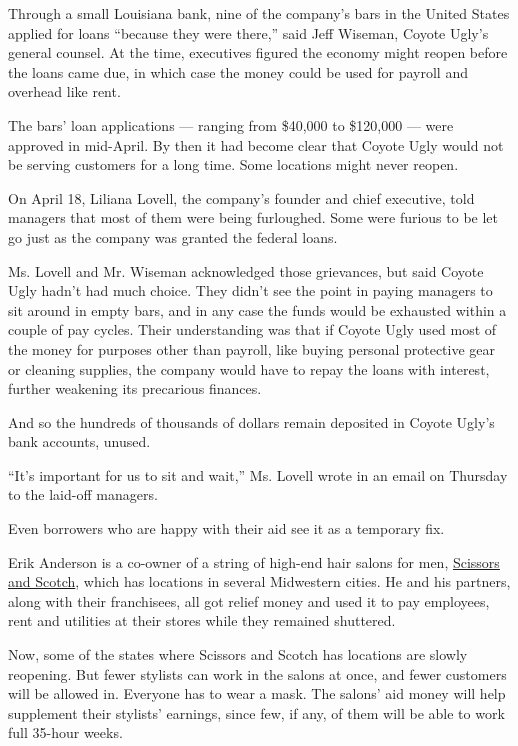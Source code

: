 Through a small Louisiana bank, nine of the company's bars in the United
States applied for loans ``because they were there,'' said Jeff Wiseman,
Coyote Ugly's general counsel. At the time, executives figured the
economy might reopen before the loans came due, in which case the money
could be used for payroll and overhead like rent.

The bars' loan applications --- ranging from \$40,000 to \$120,000 ---
were approved in mid-April. By then it had become clear that Coyote Ugly
would not be serving customers for a long time. Some locations might
never reopen.

On April 18, Liliana Lovell, the company's founder and chief executive,
told managers that most of them were being furloughed. Some were furious
to be let go just as the company was granted the federal loans.

Ms. Lovell and Mr. Wiseman acknowledged those grievances, but said
Coyote Ugly hadn't had much choice. They didn't see the point in paying
managers to sit around in empty bars, and in any case the funds would be
exhausted within a couple of pay cycles. Their understanding was that if
Coyote Ugly used most of the money for purposes other than payroll, like
buying personal protective gear or cleaning supplies, the company would
have to repay the loans with interest, further weakening its precarious
finances.

And so the hundreds of thousands of dollars remain deposited in Coyote
Ugly's bank accounts, unused.

``It's important for us to sit and wait,'' Ms. Lovell wrote in an email
on Thursday to the laid-off managers.

Even borrowers who are happy with their aid see it as a temporary fix.

Erik Anderson is a co-owner of a string of high-end hair salons for men,
\href{https://www.scissorsscotch.com/\#scissors-scotch}{Scissors and
Scotch}, which has locations in several Midwestern cities. He and his
partners, along with their franchisees, all got relief money and used it
to pay employees, rent and utilities at their stores while they remained
shuttered.

Now, some of the states where Scissors and Scotch has locations are
slowly reopening. But fewer stylists can work in the salons at once, and
fewer customers will be allowed in. Everyone has to wear a mask. The
salons' aid money will help supplement their stylists' earnings, since
few, if any, of them will be able to work full 35-hour weeks.


